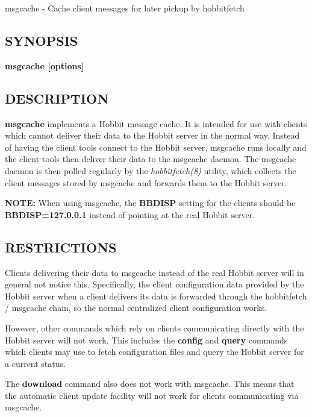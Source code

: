  msgcache - Cache client messages for later pickup by hobbitfetch 

 
\subsection{SYNOPSIS}
\textbf{msgcache [options]}


 
\subsection{DESCRIPTION}
\textbf{msgcache}
 implements a Hobbit message cache. It is intended for use with clients which cannot deliver their data to the Hobbit server in the normal way. Instead of having the client tools connect to the Hobbit server, msgcache runs locally and the client tools then deliver their data to the msgcache daemon. The msgcache daemon is then polled regularly by the \emph{hobbitfetch(8)}
 utility, which collects the client messages stored by msgcache and forwards them to the Hobbit server. 

 \textbf{NOTE:}
 When using msgcache, the \textbf{BBDISP}
 setting for the clients should be \textbf{BBDISP=127.0.0.1}
 instead of pointing at the real Hobbit server. 


 
\subsection{RESTRICTIONS}
 Clients delivering their data to msgcache instead of the real Hobbit server will in general not notice this. Specifically, the client configuration data provided by the Hobbit server when a client delivers its data is forwarded through the hobbitfetch / msgcache chain, so the normal centralized client configuration works. 

  However, other commands which rely on clients communicating directly with the Hobbit server will not work. This includes the \textbf{config}
 and \textbf{query}
 commands which clients may use to fetch configuration files and query the Hobbit server for a current status. 


  The \textbf{download}
 command also does not work with msgcache. This means that the automatic client update facility will not work for clients communicating via msgcache. 


 
